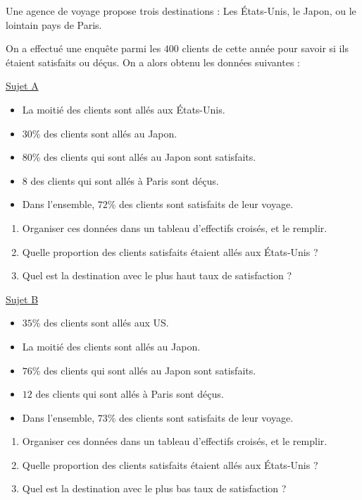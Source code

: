 \documentclass{beamer}
\begin{document}
\footnotesize

\begin{frame}
	Une agence de voyage propose trois destinations : Les États-Unis, le Japon, ou le lointain pays de Paris.

	On a effectué une enquête parmi les $400$ clients de cette année pour savoir si ils étaient satisfaits ou déçus. On a alors obtenu les données suivantes :
	\begin{multicols}{2}
		\uline{Sujet A}

		\begin{itemize}
			\item La moitié des clients sont allés aux États-Unis.
			\item $30$\% des clients sont allés au Japon.
			\item $80$\% des clients qui sont allés au Japon sont satisfaits.
			\item $8$ des clients qui sont allés à Paris sont déçus.
			\item Dans l'ensemble, $72$\% des clients sont satisfaits de leur voyage.
		\end{itemize}

		\begin{enumerate}
			\item Organiser ces données dans un tableau d'effectifs croisés, et le remplir.
			\item Quelle proportion des clients satisfaits étaient allés aux États-Unis ?
			\item Quel est la destination avec le plus haut taux de satisfaction ?
		\end{enumerate}

		\columnbreak

		\uline{Sujet B}

		\begin{itemize}
			\item $35$\% des clients sont allés aux US.
			\item La moitié des clients sont allés au Japon.
			\item $76$\% des clients qui sont allés au Japon sont satisfaits.
			\item $12$ des clients qui sont allés à Paris sont déçus.
			\item Dans l'ensemble, $73$\% des clients sont satisfaits de leur voyage.
		\end{itemize}

		\begin{enumerate}
			\item Organiser ces données dans un tableau d'effectifs croisés, et le remplir.
			\item Quelle proportion des clients satisfaits étaient allés aux États-Unis ?
			\item Quel est la destination avec le plus bas taux de satisfaction ?
		\end{enumerate}
	\end{multicols}
\end{frame}
\end{document}
